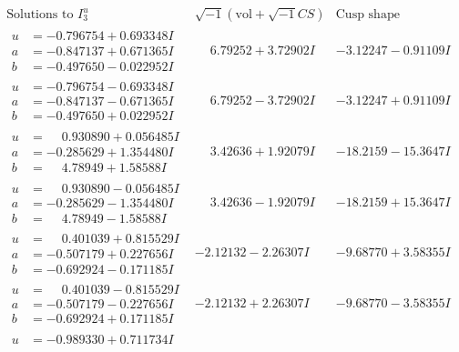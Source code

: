\documentclass[1p]{elsarticle_modified}
\theoremstyle{definition}
\newcommand{\I}{\sqrt{-1}}
\begin{document}
$$\begin{array}{c|c|c}  
\text{Solutions to }I^u_{3}& \I (\text{vol} + \sqrt{-1}CS) & \text{Cusp shape}\\
 \hline 
\begin{aligned}
u &= -0.796754 + 0.693348 I \\
a &= -0.847137 + 0.671365 I \\
b &= -0.497650 - 0.022952 I\end{aligned}
 & \phantom{-}6.79252 + 3.72902 I & -3.12247 - 0.91109 I \\ \hline\begin{aligned}
u &= -0.796754 - 0.693348 I \\
a &= -0.847137 - 0.671365 I \\
b &= -0.497650 + 0.022952 I\end{aligned}
 & \phantom{-}6.79252 - 3.72902 I & -3.12247 + 0.91109 I \\ \hline\begin{aligned}
u &= \phantom{-}0.930890 + 0.056485 I \\
a &= -0.285629 + 1.354480 I \\
b &= \phantom{-}4.78949 + 1.58588 I\end{aligned}
 & \phantom{-}3.42636 + 1.92079 I & -18.2159 - 15.3647 I \\ \hline\begin{aligned}
u &= \phantom{-}0.930890 - 0.056485 I \\
a &= -0.285629 - 1.354480 I \\
b &= \phantom{-}4.78949 - 1.58588 I\end{aligned}
 & \phantom{-}3.42636 - 1.92079 I & -18.2159 + 15.3647 I \\ \hline\begin{aligned}
u &= \phantom{-}0.401039 + 0.815529 I \\
a &= -0.507179 + 0.227656 I \\
b &= -0.692924 - 0.171185 I\end{aligned}
 & -2.12132 - 2.26307 I & -9.68770 + 3.58355 I \\ \hline\begin{aligned}
u &= \phantom{-}0.401039 - 0.815529 I \\
a &= -0.507179 - 0.227656 I \\
b &= -0.692924 + 0.171185 I\end{aligned}
 & -2.12132 + 2.26307 I & -9.68770 - 3.58355 I \\ \hline\begin{aligned}
u &= -0.989330 + 0.711734 I \\

\end{aligned}
\end{array}$$
\end{document}
